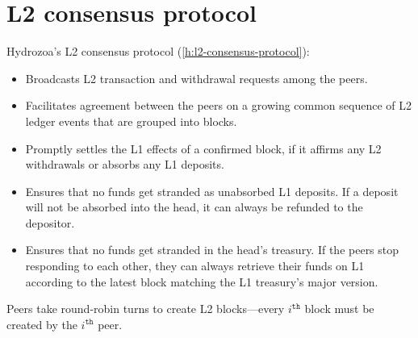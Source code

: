 \documentclass[../hydrozoa.tex]{subfiles}
\begin{document}
\section*{L2 consensus protocol}%
\label{h:overview-l2-consensus-protocol}%
%

Hydrozoa's L2 consensus protocol (\cref{h:l2-consensus-protocol}):
\begin{itemize}
  \item Broadcasts L2 transaction and withdrawal requests among the peers.
  \item Facilitates agreement between the peers on a growing common sequence of L2 ledger events that are grouped into blocks.
  \item Promptly settles the L1 effects of a confirmed block, if it affirms any L2 withdrawals or absorbs any L1 deposits.
  \item Ensures that no funds get stranded as unabsorbed L1 deposits.
  If a deposit will not be absorbed into the head, it can always be refunded to the depositor.
  \item Ensures that no funds get stranded in the head's treasury.
  If the peers stop responding to each other, they can always retrieve their funds on L1 according to the latest block matching the L1 treasury's major version.
\end{itemize}

Peers take round-robin turns to create L2 blocks---every $i^\mathtt{th}$ block must be created by the  $i^\mathtt{th}$ peer.
\end{document}
